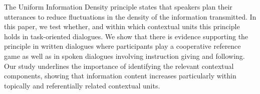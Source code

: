 The Uniform Information Density principle states that speakers plan their utterances to reduce fluctuations in the density of the information transmitted. In this paper, we test whether, and within which contextual units this principle holds in task-oriented dialogues. We show that there is evidence supporting the principle in written dialogues where participants play a cooperative reference game as well as in spoken dialogues involving instruction giving and following. Our study underlines the importance of identifying the relevant contextual components, showing that information content increases particularly within topically and referentially related contextual units.
